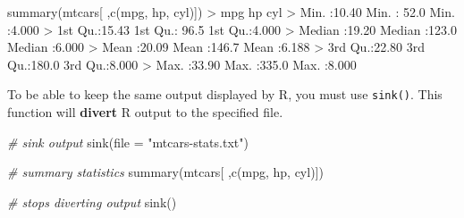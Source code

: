 \documentclass[
]{book}
\newenvironment{Shaded}{\begin{snugshade}}{\end{snugshade}}
\newcommand{\AttributeTok}[1]{\textcolor[rgb]{0.77,0.63,0.00}{#1}}
\newcommand{\CommentTok}[1]{\textcolor[rgb]{0.56,0.35,0.01}{\textit{#1}}}
\newcommand{\FloatTok}[1]{\textcolor[rgb]{0.00,0.00,0.81}{#1}}
\newcommand{\FunctionTok}[1]{\textcolor[rgb]{0.00,0.00,0.00}{#1}}
\newcommand{\NormalTok}[1]{#1}
\newcommand{\SpecialCharTok}[1]{\textcolor[rgb]{0.00,0.00,0.00}{#1}}
\newcommand{\StringTok}[1]{\textcolor[rgb]{0.31,0.60,0.02}{#1}}
\begin{document}
\begin{Shaded}
\begin{Highlighting}[]
\FunctionTok{summary}\NormalTok{(mtcars[ ,}\FunctionTok{c}\NormalTok{(}\StringTok{\textquotesingle{}mpg\textquotesingle{}}\NormalTok{, }\StringTok{\textquotesingle{}hp\textquotesingle{}}\NormalTok{, }\StringTok{\textquotesingle{}cyl\textquotesingle{}}\NormalTok{)])}
\SpecialCharTok{\textgreater{}}\NormalTok{       mpg              hp             cyl       }
\SpecialCharTok{\textgreater{}}\NormalTok{  Min.   }\SpecialCharTok{:}\FloatTok{10.40}\NormalTok{   Min.   }\SpecialCharTok{:} \FloatTok{52.0}\NormalTok{   Min.   }\SpecialCharTok{:}\FloatTok{4.000}  
\SpecialCharTok{\textgreater{}}\NormalTok{  1st Qu.}\SpecialCharTok{:}\FloatTok{15.43}\NormalTok{   1st Qu.}\SpecialCharTok{:} \FloatTok{96.5}\NormalTok{   1st Qu.}\SpecialCharTok{:}\FloatTok{4.000}  
\SpecialCharTok{\textgreater{}}\NormalTok{  Median }\SpecialCharTok{:}\FloatTok{19.20}\NormalTok{   Median }\SpecialCharTok{:}\FloatTok{123.0}\NormalTok{   Median }\SpecialCharTok{:}\FloatTok{6.000}  
\SpecialCharTok{\textgreater{}}\NormalTok{  Mean   }\SpecialCharTok{:}\FloatTok{20.09}\NormalTok{   Mean   }\SpecialCharTok{:}\FloatTok{146.7}\NormalTok{   Mean   }\SpecialCharTok{:}\FloatTok{6.188}  
\SpecialCharTok{\textgreater{}}\NormalTok{  3rd Qu.}\SpecialCharTok{:}\FloatTok{22.80}\NormalTok{   3rd Qu.}\SpecialCharTok{:}\FloatTok{180.0}\NormalTok{   3rd Qu.}\SpecialCharTok{:}\FloatTok{8.000}  
\SpecialCharTok{\textgreater{}}\NormalTok{  Max.   }\SpecialCharTok{:}\FloatTok{33.90}\NormalTok{   Max.   }\SpecialCharTok{:}\FloatTok{335.0}\NormalTok{   Max.   }\SpecialCharTok{:}\FloatTok{8.000}
\end{Highlighting}
\end{Shaded}

To be able to keep the same output displayed by R, you must use \texttt{sink()}. This
function will \textbf{divert} R output to the specified file.

\begin{Shaded}
\begin{Highlighting}[]
\CommentTok{\# sink output}
\FunctionTok{sink}\NormalTok{(}\AttributeTok{file =} \StringTok{"mtcars{-}stats.txt"}\NormalTok{)}

\CommentTok{\# summary statistics}
\FunctionTok{summary}\NormalTok{(mtcars[ ,}\FunctionTok{c}\NormalTok{(}\StringTok{\textquotesingle{}mpg\textquotesingle{}}\NormalTok{, }\StringTok{\textquotesingle{}hp\textquotesingle{}}\NormalTok{, }\StringTok{\textquotesingle{}cyl\textquotesingle{}}\NormalTok{)])}

\CommentTok{\# stops diverting output}
\FunctionTok{sink}\NormalTok{()}
\end{Highlighting}
\end{Shaded}
\end{document}
